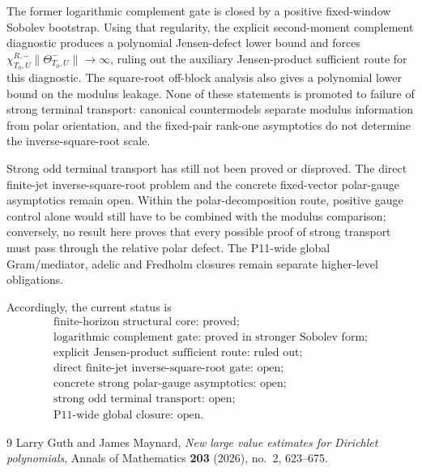 \documentclass[11pt,a4paper]{amsart}
\begin{document}
The former logarithmic complement gate is closed by a positive fixed-window Sobolev
bootstrap.  Using that regularity, the explicit second-moment complement diagnostic
produces a polynomial Jensen-defect lower bound and forces
$\chi_{T_0,U}^{R,-}\|\Theta_{T_0,U}^-\|\to\infty$, ruling out the auxiliary
Jensen-product sufficient route for this diagnostic.  The square-root off-block analysis
also gives a polynomial lower bound on the modulus leakage.  None of these statements
is promoted to failure of strong terminal transport: canonical countermodels separate
modulus information from polar orientation, and the fixed-pair rank-one asymptotics do
not determine the inverse-square-root scale.

Strong odd terminal transport has still not been proved or disproved.  The direct
finite-jet inverse-square-root problem and the concrete fixed-vector polar-gauge
asymptotics remain open.  Within the polar-decomposition route, positive gauge control
alone would still have to be combined with the modulus comparison; conversely, no
result here proves that every possible proof of strong transport must pass through the
relative polar defect.  The P11-wide global Gram/mediator, adelic and Fredholm closures
remain separate higher-level obligations.

Accordingly, the current status is
\[
 \boxed{
 \begin{gathered}
 \text{finite-horizon structural core: proved;}\\
 \text{logarithmic complement gate: proved in stronger Sobolev form;}\\
 \text{explicit Jensen-product sufficient route: ruled out;}\\
 \text{direct finite-jet inverse-square-root gate: open;}\\
 \text{concrete strong polar-gauge asymptotics: open;}\\
 \text{strong odd terminal transport: open;}\\
 \text{P11-wide global closure: open.}
 \end{gathered}
 }
\]

\begin{thebibliography}{9}
Larry Guth and James Maynard,
\emph{New large value estimates for Dirichlet polynomials},
Annals of Mathematics \textbf{203} (2026), no.~2, 623--675.
\end{thebibliography}
\end{document}

